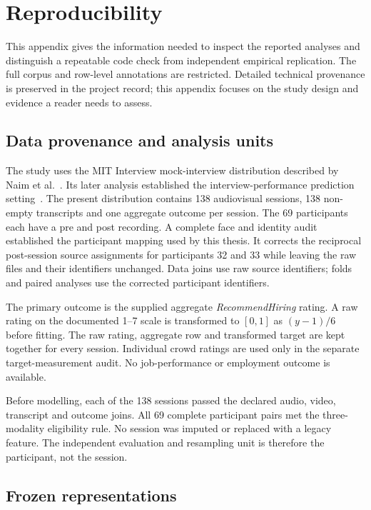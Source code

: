 \chapter{Reproducibility}
\label{app:reproducibility}

This appendix gives the information needed to inspect the reported analyses and distinguish a
repeatable code check from independent empirical replication. The full corpus and row-level
annotations are restricted. Detailed technical provenance is preserved in the project record;
this appendix focuses on the study design and evidence a reader needs to assess.

\section{Data provenance and analysis units}

The study uses the MIT Interview mock-interview distribution described by Naim et
al.~\cite{Naim2015}. Its later analysis established the interview-performance prediction
setting~\cite{Naim2018}. The present distribution contains 138 audiovisual sessions, 138
non-empty transcripts and one aggregate outcome per session. The 69 participants each have a
pre and post recording. A complete face and identity audit established the participant mapping
used by this thesis. It corrects the reciprocal post-session source assignments for participants
32 and 33 while leaving the raw files and their identifiers unchanged. Data joins use raw source
identifiers; folds and paired analyses use the corrected participant identifiers.

The primary outcome is the supplied aggregate \emph{RecommendHiring} rating. A raw rating on
the documented 1--7 scale is transformed to $[0,1]$ as $(y-1)/6$ before fitting. The raw
rating, aggregate row and transformed target are kept together for every session. Individual
crowd ratings are used only in the separate target-measurement audit. No job-performance or
employment outcome is available.

Before modelling, each of the 138 sessions passed the declared audio, video, transcript and
outcome joins. All 69 complete participant pairs met the three-modality eligibility rule. No
session was imputed or replaced with a legacy feature. The independent evaluation and resampling
unit is therefore the participant, not the session.

\section{Frozen representations}

